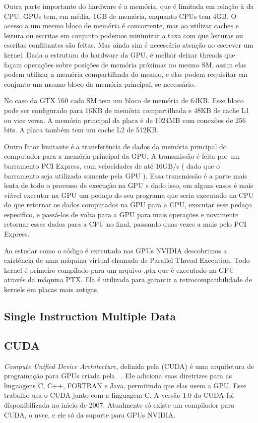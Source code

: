 Outra parte importante do hardware é a memória, que é limitada em relação à da CPU. GPUs tem, em média, 1GB
de memória, enquanto CPUs tem 4GB. O acesso a um mesmo bloco de memória é concorrente, mas ao utilizar caches e leitura ou escritas em
conjunto podemos minimizar a taxa com que leituras ou escritas conflitantes são feitas. Mas ainda sim é necessário atenção ao escrever um
kernel. Dada a estrutura do hardware da GPU, é melhor deixar threads que façam operações sobre posições de memória próximas no mesmo
SM, assim elas podem utilizar a memória compartilhada do mesmo, e elas podem requisitar em conjunto um mesmo bloco da memória principal,
se necessário.

No caso da GTX 760 cada SM tem um bloco de memória de 64KB. Esse bloco pode ser configurado para 16KB de memória compartilhada e 48KB
de cache L1 ou vice versa. A memória principal da placa é de 1024MB com conexões de 256 bits. A placa também tem um
cache L2 de 512KB.

Outro fator limitante é a transferência de dados da memória principal do computador para a memória 
principal da GPU. A transmissão é feita por um barramento PCI Express, com velocidades de até 16GB/s ( dado que o
barramento seja utilizado somente pela GPU ). Essa transmissão é a parte mais lenta de todo o
processo de execução na GPU e dado isso, em alguns casos é mais viável executar na GPU um pedaço do seu programa que seria executado
na CPU do que retornar os dados computados na GPU para a CPU, executar esse pedaço especifico, e passá-los de volta para a GPU 
para mais operações e novamente retornar esses dados para a CPU no final, passando duas vezes a mais pelo PCI Express. 

Ao estudar como o código é executado nas GPUs NVIDIA descobrimos a existência de uma máquina virtual chamada de Parallel Thread Execution.
Todo kernel é primeiro compilado para um arquivo .ptx que é executado na GPU através da máquina PTX. Ela é utilizada para garantir 
a retrocompatibilidade de kernels em placas mais antigas.
\subsection{Single Instruction Multiple Data}

\subsection{CUDA}
\textit{Compute Unified Device Architecture}, definida pela (CUDA) é uma arquitetura de programação para GPUs criada 
pela ~\cite{nvidia2007compute}.
Ele adiciona suas diretrizes para as linguagens C, C++, FORTRAN e Java, permitindo que elas usem a GPU.
Esse trabalho usa o CUDA junto com a linguagem C.
A versão 1.0 do CUDA foi disponibilizada no inicio de 2007. Atualmente só existe um compilador para CUDA, o nvcc,
e ele só da suporte para GPUs NVIDIA.


